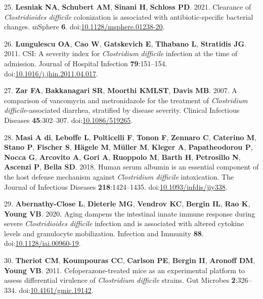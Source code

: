 \documentclass[
  12pt,
]{article}
\newenvironment{cslreferences}%
  {}%
  {\par}
\begin{document}
\begin{cslreferences}
\leavevmode\hypertarget{ref-Lesniak2021}{}%
25. \textbf{Lesniak NA}, \textbf{Schubert AM}, \textbf{Sinani H},
\textbf{Schloss PD}. 2021. Clearance of \emph{Clostridioides difficile}
colonization is associated with antibiotic-specific bacterial changes.
mSphere \textbf{6}.
doi:\href{https://doi.org/10.1128/msphere.01238-20}{10.1128/msphere.01238-20}.

\leavevmode\hypertarget{ref-Lungulescu2011}{}%
26. \textbf{Lungulescu OA}, \textbf{Cao W}, \textbf{Gatskevich E},
\textbf{Tlhabano L}, \textbf{Stratidis JG}. 2011. CSI: A severity index
for \emph{Clostridium difficile} infection at the time of admission.
Journal of Hospital Infection \textbf{79}:151--154.
doi:\href{https://doi.org/10.1016/j.jhin.2011.04.017}{10.1016/j.jhin.2011.04.017}.

\leavevmode\hypertarget{ref-Zar2007}{}%
27. \textbf{Zar FA}, \textbf{Bakkanagari SR}, \textbf{Moorthi KMLST},
\textbf{Davis MB}. 2007. A comparison of vancomycin and metronidazole
for the treatment of \emph{Clostridium difficile}-associated diarrhea,
stratified by disease severity. Clinical Infectious Diseases
\textbf{45}:302--307.
doi:\href{https://doi.org/10.1086/519265}{10.1086/519265}.

\leavevmode\hypertarget{ref-diMasi2018}{}%
28. \textbf{Masi A di}, \textbf{Leboffe L}, \textbf{Polticelli F},
\textbf{Tonon F}, \textbf{Zennaro C}, \textbf{Caterino M}, \textbf{Stano
P}, \textbf{Fischer S}, \textbf{Hägele M}, \textbf{Müller M},
\textbf{Kleger A}, \textbf{Papatheodorou P}, \textbf{Nocca G},
\textbf{Arcovito A}, \textbf{Gori A}, \textbf{Ruoppolo M}, \textbf{Barth
H}, \textbf{Petrosillo N}, \textbf{Ascenzi P}, \textbf{Bella SD}. 2018.
Human serum albumin is an essential component of the host defense
mechanism against \emph{Clostridium difficile} intoxication. The Journal
of Infectious Diseases \textbf{218}:1424--1435.
doi:\href{https://doi.org/10.1093/infdis/jiy338}{10.1093/infdis/jiy338}.

\leavevmode\hypertarget{ref-AbernathyClose2020}{}%
29. \textbf{Abernathy-Close L}, \textbf{Dieterle MG}, \textbf{Vendrov
KC}, \textbf{Bergin IL}, \textbf{Rao K}, \textbf{Young VB}. 2020. Aging
dampens the intestinal innate immune response during severe
\emph{Clostridioides difficile} infection and is associated with altered
cytokine levels and granulocyte mobilization. Infection and Immunity
\textbf{88}.
doi:\href{https://doi.org/10.1128/iai.00960-19}{10.1128/iai.00960-19}.

\leavevmode\hypertarget{ref-Theriot2011}{}%
30. \textbf{Theriot CM}, \textbf{Koumpouras CC}, \textbf{Carlson PE},
\textbf{Bergin II}, \textbf{Aronoff DM}, \textbf{Young VB}. 2011.
Cefoperazone-treated mice as an experimental platform to assess
differential virulence of \emph{Clostridium difficile} strains. Gut
Microbes \textbf{2}:326--334.
doi:\href{https://doi.org/10.4161/gmic.19142}{10.4161/gmic.19142}.


\end{cslreferences}
\end{document}
